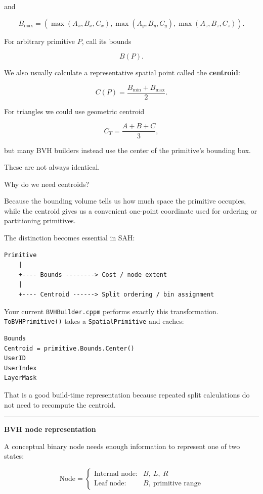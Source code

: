 and

\[
B_{\max}=
\left(
\max(A_x,B_x,C_x),
\max(A_y,B_y,C_y),
\max(A_z,B_z,C_z)
\right).
\]

For arbitrary primitive \(P\), call its bounds

\[
B(P).
\]

We also usually calculate a representative spatial point called the \textbf{centroid}:

\[
C(P)=\frac{B_{\min}+B_{\max}}{2}.
\]

For triangles we could use geometric centroid

\[
C_T=\frac{A+B+C}{3},
\]

but many BVH builders instead use the center of the primitive's bounding box.

These are not always identical.

Why do we need centroids?

Because the bounding volume tells us how much space the primitive occupies, while the centroid gives us a convenient one-point coordinate used for ordering or partitioning primitives.

The distinction becomes essential in SAH:

\begin{verbatim}
Primitive
    |
    +---- Bounds --------> Cost / node extent
    |
    +---- Centroid ------> Split ordering / bin assignment
\end{verbatim}

Your current \texttt{BVHBuilder.cppm} performs exactly this transformation. \texttt{ToBVHPrimitive()} takes a \texttt{SpatialPrimitive} and caches:

\begin{verbatim}
Bounds
Centroid = primitive.Bounds.Center()
UserID
UserIndex
LayerMask
\end{verbatim}

That is a good build-time representation because repeated split calculations do not need to recompute the centroid.

\begin{center}\rule{0.5\linewidth}{0.5pt}\end{center}

\textbf{BVH node representation}

A conceptual binary node needs enough information to represent one of two states:

\[
\text{Node}
=
\begin{cases}
\text{Internal node}:& B,\ L,\ R\\[2mm]
\text{Leaf node}:& B,\ \text{primitive range}
\end{cases}
\]

